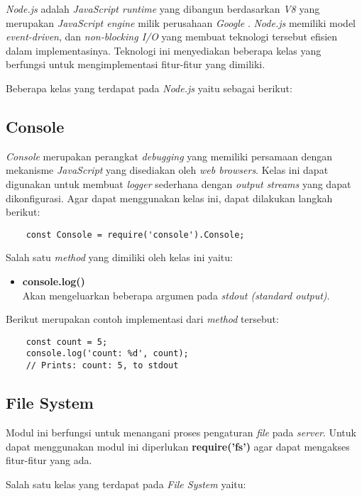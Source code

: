 \textit{Node.js} adalah \textit{JavaScript runtime} yang dibangun berdasarkan \textit{V8} yang merupakan \textit{JavaScript engine} milik perusahaan \textit{Google} \cite{nodejs}. \textit{Node.js} memiliki model \textit{event-driven}, dan \textit{non-blocking I/O} yang membuat teknologi tersebut efisien dalam implementasinya. Teknologi ini menyediakan beberapa kelas yang berfungsi untuk mengimplementasi fitur-fitur yang dimiliki.

Beberapa kelas yang terdapat pada \textit{Node.js} yaitu sebagai berikut: 

\subsection{Console}
\textit{Console} merupakan perangkat \textit{debugging} yang memiliki persamaan dengan mekanisme \textit{JavaScript} yang disediakan oleh \textit{web browsers}. Kelas ini dapat digunakan untuk membuat \textit{logger} sederhana dengan \textit{output streams} yang dapat dikonfigurasi. Agar dapat menggunakan kelas ini, dapat dilakukan langkah berikut: 

\begin{lstlisting}
	const Console = require('console').Console;
\end{lstlisting}

Salah satu \textit{method} yang dimiliki oleh kelas ini yaitu: 

\begin{itemize}
	\item \textbf{console.log()} \\ Akan mengeluarkan beberapa argumen pada \textit{stdout (standard output)}.
\end{itemize}

Berikut merupakan contoh implementasi dari \textit{method} tersebut:

\begin{lstlisting}
	const count = 5;
	console.log('count: %d', count);
	// Prints: count: 5, to stdout
\end{lstlisting}

\subsection{File System}
Modul ini berfungsi untuk menangani proses pengaturan \textit{file} pada \textit{server}. Untuk dapat menggunakan modul ini diperlukan \textbf{require('fs')} agar dapat mengakses fitur-fitur yang ada.

Salah satu kelas yang terdapat pada \textit{File System} yaitu: 

